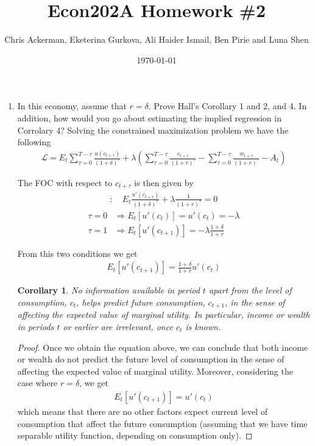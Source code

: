 \documentclass[11pt]{article}
\author{Chris Ackerman, Eketerina Gurkova, Ali Haider Ismail, Ben Pirie and Luna Shen}
\date{\today}
\title{Econ202A Homework \#2}
\newtheorem*{corollary}{Corollary}
\begin{document}
\maketitle
\newpage

\begin{enumerate}
\item In this economy, assume that $r = \delta$. Prove Hall’s Corollary 1 and 2, and 4. In addition, how would you go about estimating the implied regression in Corrolary 4?
Solving the constrained maximization problem we have the following
\begin{align*}
    \mathcal{L} = E_t \sum_{\tau=0}^{T-\tau} \frac{u(c_{t+\tau})}{(1+\delta)^\tau} + \lambda \left(\sum_{\tau=0}^{T-\tau} \frac{c_{t+\tau}}{(1+r)^\tau} - \sum_{\tau=0}^{T-\tau}\frac{w_{t+\tau}}{(1+r)^\tau} - A_t \right)
\end{align*}

The FOC with respect to $c_{t+\tau}$ is then given by
\begin{align*}
    [c_{t+\tau}]: \quad  E_t \frac{u'(c_{t+\tau})}{(1+\delta)^\tau} + \lambda \frac{1}{(1+r)^\tau} = 0
\end{align*}
\begin{align*}
    \tau = 0 & \Rightarrow E_t [u'(c_t)] = u'(c_t) = -\lambda\\
    \tau = 1 & \Rightarrow E_t [u'(c_{t+1})] = - \lambda \frac{1+\delta}{1+r}
\end{align*}

From this two conditions we get
\begin{align*}
    E_t [u'(c_{t+1})] =  \frac{1+\delta}{1+r} u'(c_t)
\end{align*}

\begin{corollary}
No information available in period $t$ apart from the level of consumption, $c_t$, helps predict future consumption, $c_{t+1}$, in the sense of affecting the expected value of marginal utility. In particular, income or wealth in periods $t$ or earlier are irrelevant, once $c_t$ is known. 
\end{corollary}

\begin{proof}
Once we obtain the equation above, we can conclude that both income or wealth do not predict the future level of consumption in the sense of affecting the expected value of marginal utility. Moreover, considering the case where $r=\delta$, we get
\begin{align*}
    E_t [u'(c_{t+1})] =   u'(c_t)
\end{align*}
which means that there are no other factors expect current level of consumption that affect the future consumption (assuming that we have time separable utility function, depending on consumption only).
\end{proof}


\end{enumerate}
\end{document}
